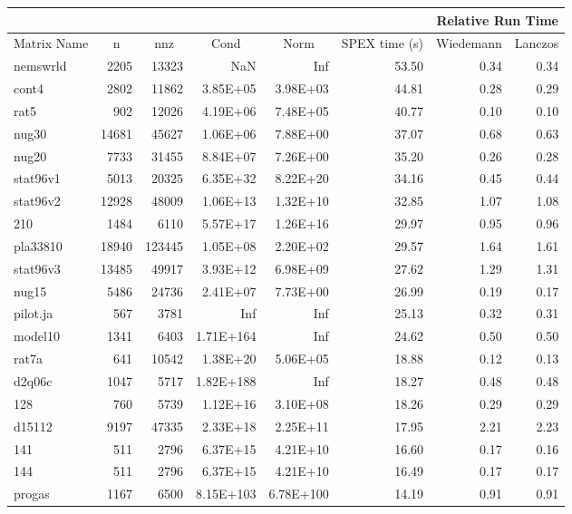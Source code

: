 \documentclass[10pt]{article}
\begin{document}
\begin{longtable}{|l|r|r|r|r|r|r|r|}
\hline	
& & & & & & \multicolumn{2}{c|}{Relative Run Time}  \\ \hline
\multicolumn{1}{|c|}{Matrix Name}	& \multicolumn{1}{c|}{n} & \multicolumn{1}{c|}{nnz} & \multicolumn{1}{c|}{Cond} & \multicolumn{1}{c|}{Norm} & \multicolumn{1}{c|}{SPEX time (s)} & \multicolumn{1}{c|}{Wiedemann} & \multicolumn{1}{c|}{Lanczos} \\  \hline \endhead
nemswrld	&	2205	&	13323	&	NaN	&	Inf	&	53.50	&	0.34	&	0.34	\\
cont4	&	2802	&	11862	&	3.85E+05	&	3.98E+03	&	44.81	&	0.28	&	0.29	\\
rat5	&	902	&	12026	&	4.19E+06	&	7.48E+05	&	40.77	&	0.10	&	0.10	\\
nug30	&	14681	&	45627	&	1.06E+06	&	7.88E+00	&	37.07	&	0.68	&	0.63	\\
nug20	&	7733	&	31455	&	8.84E+07	&	7.26E+00	&	35.20	&	0.26	&	0.28	\\
stat96v1	&	5013	&	20325	&	6.35E+32	&	8.22E+20	&	34.16	&	0.45	&	0.44	\\
stat96v2	&	12928	&	48009	&	1.06E+13	&	1.32E+10	&	32.85	&	1.07	&	1.08	\\
210	&	1484	&	6110	&	5.57E+17	&	1.26E+16	&	29.97	&	0.95	&	0.96	\\
pla33810	&	18940	&	123445	&	1.05E+08	&	2.20E+02	&	29.57	&	1.64	&	1.61	\\
stat96v3	&	13485	&	49917	&	3.93E+12	&	6.98E+09	&	27.62	&	1.29	&	1.31	\\
nug15	&	5486	&	24736	&	2.41E+07	&	7.73E+00	&	26.99	&	0.19	&	0.17	\\
pilot.ja	&	567	&	3781	&	Inf	&	Inf	&	25.13	&	0.32	&	0.31	\\
model10	&	1341	&	6403	&	1.71E+164	&	Inf	&	24.62	&	0.50	&	0.50	\\
rat7a	&	641	&	10542	&	1.38E+20	&	5.06E+05	&	18.88	&	0.12	&	0.13	\\
d2q06c	&	1047	&	5717	&	1.82E+188	&	Inf	&	18.27	&	0.48	&	0.48	\\
128	&	760	&	5739	&	1.12E+16	&	3.10E+08	&	18.26	&	0.29	&	0.29	\\
d15112	&	9197	&	47335	&	2.33E+18	&	2.25E+11	&	17.95	&	2.21	&	2.23	\\
141	&	511	&	2796	&	6.37E+15	&	4.21E+10	&	16.60	&	0.17	&	0.16	\\
144	&	511	&	2796	&	6.37E+15	&	4.21E+10	&	16.49	&	0.17	&	0.17	\\
progas	&	1167	&	6500	&	8.15E+103	&	6.78E+100	&	14.19	&	0.91	&	0.91	\\

\end{longtable}
\end{document}
